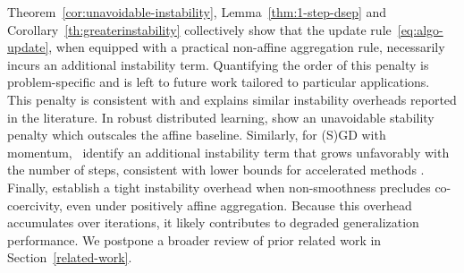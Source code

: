\documentclass[twoside,11pt]{article}
\begin{document}
Theorem~\ref{cor:unavoidable-instability}, Lemma~\ref{thm:1-step-dsep} and Corollary~\ref{th:greaterinstability} collectively show that the update rule~\eqref{eq:algo-update}, when equipped with a practical non-affine aggregation rule, necessarily incurs an additional instability term. 
Quantifying the order of this penalty is problem-specific and is left to future work tailored to particular applications.
This penalty is consistent with and explains similar instability overheads reported in the literature.
In robust distributed learning, \citet[Theorem 3.4]{boudou2025generalization} show an unavoidable stability penalty which outscales the affine baseline.
Similarly, for (S)GD with momentum,~\citet[Theorem 3]{JMLR:v25:22-0068stabilitymomentum} identify an additional instability term that grows unfavorably with the number of steps, consistent with lower bounds for accelerated methods \citep{attia2021algorithmic}.
Finally, \citet{bassily2019private} establish a tight instability overhead when non-smoothness precludes co-coercivity, even under positively affine aggregation.
Because this overhead accumulates over iterations, it likely contributes to degraded generalization performance.
We postpone a broader review of prior related work in Section~\ref{related-work}.
\end{document}
